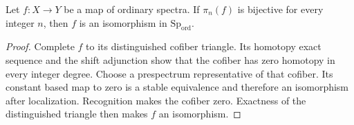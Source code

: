 \begin{theorem}
\label{sem:AdamsSynthetic:homotopy-detects-isomorphisms}
Let $f\colon X\to Y$ be a map of ordinary spectra.
If $\pi_n(f)$ is bijective for every integer $n$, then $f$ is an
isomorphism in $\mathrm{Sp}_{\mathrm{ord}}$.
\end{theorem}
\begin{proof}
Complete $f$ to its distinguished cofiber triangle.
Its homotopy exact sequence and the shift adjunction show that the
cofiber has zero homotopy in every integer degree. Choose a prespectrum
representative of that cofiber. Its constant based map to zero is a
stable equivalence and therefore an isomorphism after localization.
Recognition makes the cofiber zero. Exactness of the distinguished
triangle then makes $f$ an isomorphism.
\end{proof}
